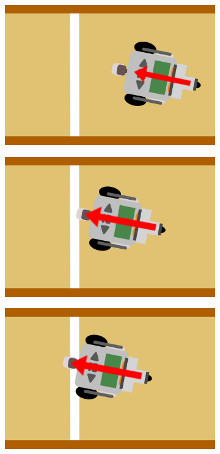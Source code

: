 \documentclass[eind]{penoverslag}
\begin{document}
\begin{figure}[h]
\centering
	\begin{subfigure}[h]{0.24\textwidth}
		\includegraphics[width=\textwidth]{WitteLijn1}
		\caption{ }
		\label{fig:AlgoWit1}
	\end{subfigure}
	\begin{subfigure}[h]{0.24\textwidth}
		\includegraphics[width=\textwidth]{WitteLijn2}
		\caption{ }
		\label{fig:AlgoWit2}
	\end{subfigure}
	\begin{subfigure}[h]{0.24\textwidth}
		\includegraphics[width=\textwidth]{WitteLijn3}

\end{subfigure}
\end{figure}
\end{document}
